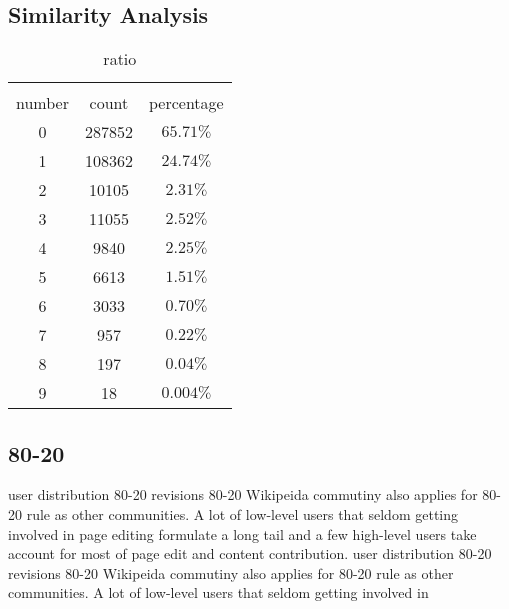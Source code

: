\documentclass{elsarticle}
\begin{document}
\subsection{Similarity Analysis}
\label{sec:similarity-analysis}

\begin{table}
  \centering
  \caption{ratio}
  \begin{tabular}[center]{|c|c|c|}
    \hline\\
    number & count & percentage \\\hline
    0 & 287852& $65.71\%$\\\hline
    1 & 108362& $24.74\%$\\\hline
    2 & 10105& $2.31\%$\\\hline
    3 & 11055& $2.52\%$\\\hline
    4 & 9840&$2.25\%$ \\\hline
    5 & 6613& $1.51\%$\\\hline
    6 & 3033& $0.70\%$\\\hline
    7 & 957& $0.22\%$\\\hline
    8 & 197& $0.04\%$\\\hline
    9 & 18& $0.004\%$\\\hline
    
  \end{tabular}
  
\end{table}

\subsection{80-20}
\label{sec:80-20}
user distribution 80-20
revisions 80-20
Wikipeida commutiny also applies for 80-20 rule as other
communities. A lot of low-level users that seldom getting involved in
page editing formulate a long tail and a few high-level users take
account for most of page edit and content contribution.
\label{sec:80-20}
user distribution 80-20
revisions 80-20
Wikipeida commutiny also applies for 80-20 rule as other
communities. A lot of low-level users that seldom getting involved in
\end{document}
